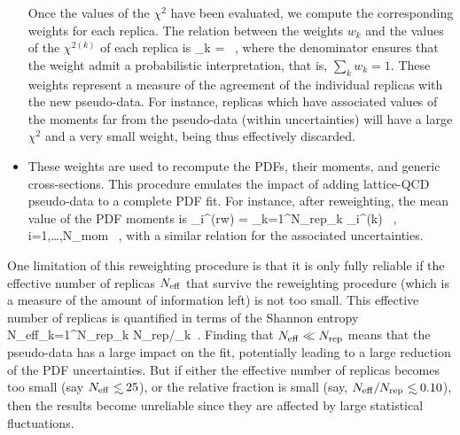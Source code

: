 \begin{itemize}
  Once the values of the $\chi^2$ have been evaluated,
  we compute the corresponding weights for each replica.
  The relation between the weights $w_k$  and the values of
  the $\chi^{2(k)}$ of each replica is
  \be
  \omega_k = \, ,
  \ee
  where the denominator ensures that the weight admit
  a probabilistic interpretation, that is, $\sum_k w_k=1$.
  These weights represent a measure of the agreement of the individual replicas with the new pseudo-data.
  For instance, replicas which have associated values
  of the moments far from the pseudo-data (within uncertainties) will
  have  a large $\chi^2$ and a very small weight, being thus effectively discarded.
\item These weights are used to recompute the PDFs, their moments,
  and generic cross-sections.
  This procedure emulates the
  impact of adding lattice-QCD pseudo-data to a complete PDF fit.
  For instance, after reweighting, the mean value of
  the PDF moments is
   \be
  \label{eq:pseudodatadef1}
  _i^{\rm (rw)} = \sum_{k=1}^{N_{\rm rep}}\omega_k
  _i^{\rm (k)} \, , \quad i=1,\ldots,N_{\rm mom} \, ,
  \ee
  with a similar relation for the associated uncertainties.
\end{itemize}

One limitation of this reweighting procedure is that it is only fully 
 reliable if the 
  effective number of replicas $N_{\rm eff}$ that survive the reweighting
  procedure (which is a measure of the amount
  of information left) is not too small.
  This effective number of replicas
    is quantified in terms of the Shannon entropy
    \be
    \label{eq:effnrep}
    N_{\rm eff}\equiv \exp\lc {}\sum_{k=1}^{N_{\rm rep}}\omega_k
    \log \lp N_{\rm rep}/\omega_k\rp\rc \, .
    \ee
    Finding that $N_{\rm eff}\ll N_{\rm rep}$ means that the pseudo-data
    has a large impact on the fit, potentially leading to a large
    reduction of the PDF uncertainties.
    But if either the effective number of replicas becomes too
    small (say $N_{\rm eff}\lsim 25$), 
    or the relative fraction is small (say, $N_{\rm eff}/N_{\rm rep}\lsim 0.10$),
then the results
    become unreliable since they are affected by large
    statistical fluctuations.

